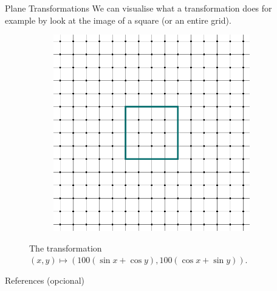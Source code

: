 \documentclass[final]{beamer}
\newlength{\sepwidth}
\newlength{\colwidth}
\newcommand{\separatorcolumn}{\begin{column}{\sepwidth}\end{column}}
\begin{document}
\begin{frame}[t]
\begin{columns}[t]
\begin{column}{\colwidth}
\begin{block}{Plane Transformations}
  We can visualise what a transformation does for example by look at the image
  of a square (or an entire grid).
  \begin{figure}[H]
   \centering
   \begin{subfigure}[b]{.3\textwidth}
    \centering
    \includegraphics[width=\textwidth]{grid.png}
   \end{subfigure}
   \caption*{The transformation \alert{$(x,y) \mapsto (100(\sin x + \cos y),
   100(\cos x + \sin y))$}.}
  \end{figure}
 \end{block}

  \begin{block}{References (opcional)}

    \nocite{*}
    \footnotesize{}

  \end{block}

\end{column}
\separatorcolumn



\end{columns}
\end{frame}
\end{document}
